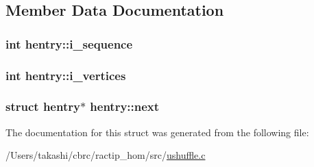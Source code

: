 \subsection{Member Data Documentation}
\hypertarget{structhentry_a5411cfacc693173761cb14a6abe4e756}{
\subsubsection[{i\+\_\+sequence}]{\setlength{\rightskip}{0pt plus 5cm}int hentry\+::i\+\_\+sequence}}\label{structhentry_a5411cfacc693173761cb14a6abe4e756}
\hypertarget{structhentry_a72c714e369c96f7f198462dbc7a6e21d}{
\subsubsection[{i\+\_\+vertices}]{\setlength{\rightskip}{0pt plus 5cm}int hentry\+::i\+\_\+vertices}}\label{structhentry_a72c714e369c96f7f198462dbc7a6e21d}
\hypertarget{structhentry_a94f2927d851d194c036657b96aeb8a08}{
\subsubsection[{next}]{\setlength{\rightskip}{0pt plus 5cm}struct {\bf hentry}$\ast$ hentry\+::next}}\label{structhentry_a94f2927d851d194c036657b96aeb8a08}


The documentation for this struct was generated from the following file\+:\begin{DoxyCompactItemize}
\item 
/\+Users/takashi/cbrc/ractip\+\_\+hom/src/\hyperlink{ushuffle_8c}{ushuffle.\+c}\end{DoxyCompactItemize}
